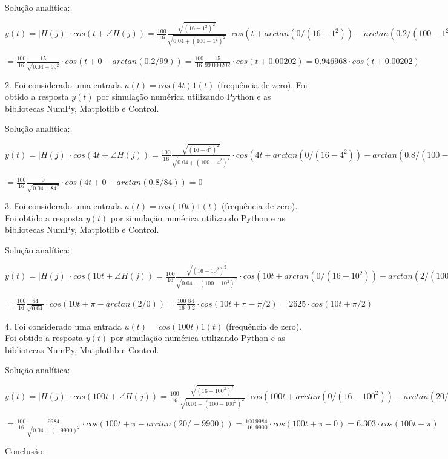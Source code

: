 \documentclass[10pt]{article}
\begin{document}
Solução analítica:

$y(t) = |H(j)| \cdot cos(t + \angle H(j)) = \frac{100}{16} \frac{\sqrt{(16-1^2)^2}}{\sqrt{0.04 + (100 - 1^2)^2}} \cdot cos(t + arctan(0/(16 - 1^2)) - arctan(0.2/(100 - 1^2))) =$

$= \frac{100}{16} \frac{15}{\sqrt{0.04 + 99^2}} \cdot cos(t + 0 - arctan(0.2/99)) = \frac{100}{16} \frac{15}{99.000202} \cdot cos(t + 0.00202) = 0.946968 \cdot cos(t + 0.00202)$

2. Foi considerado uma entrada $u(t) = cos(4 t) 1(t)$ (frequência de zero). Foi obtido a resposta $y(t)$ por simulação numérica utilizando Python
e as bibliotecas NumPy, Matplotlib e Control.

Solução analítica:

$y(t) = |H(j)| \cdot cos(4 t + \angle H(j)) = \frac{100}{16} \frac{\sqrt{(16-4^2)^2}}{\sqrt{0.04 + (100 - 4^2)^2}} \cdot cos(4 t + arctan(0/(16 - 4^2)) - arctan(0.8/(100 - 4^2))) =$

$= \frac{100}{16} \frac{0}{\sqrt{0.04 + 84^2}} \cdot cos(4 t + 0 - arctan(0.8/84)) = 0$

3. Foi considerado uma entrada $u(t) = cos(10 t) 1(t)$ (frequência de zero). Foi obtido a resposta $y(t)$ por simulação numérica utilizando Python
e as bibliotecas NumPy, Matplotlib e Control.

Solução analítica:

$y(t) = |H(j)| \cdot cos(10 t + \angle H(j)) = \frac{100}{16} \frac{\sqrt{(16-10^2)^2}}{\sqrt{0.04 + (100 - 10^2)^2}} \cdot cos(10 t + arctan(0/(16 - 10^2)) - arctan(2/(100 - 10^2))) =$

$= \frac{100}{16} \frac{84}{\sqrt{0.04}} \cdot cos(10 t + \pi - arctan(2/0)) = \frac{100}{16} \frac{84}{0.2} \cdot cos(10 t + \pi - \pi/2) = 2625 \cdot cos(10 t + \pi/2)$

4. Foi considerado uma entrada $u(t) = cos(100 t) 1(t)$ (frequência de zero). Foi obtido a resposta $y(t)$ por simulação numérica utilizando Python
e as bibliotecas NumPy, Matplotlib e Control.

Solução analítica:

$y(t) = |H(j)| \cdot cos(100 t + \angle H(j)) = \frac{100}{16} \frac{\sqrt{(16-100^2)^2}}{\sqrt{0.04 + (100 - 100^2)^2}} \cdot cos(100 t + arctan(0/(16 - 100^2)) - arctan(20/(100 - 100^2))) =$

$= \frac{100}{16} \frac{9984}{\sqrt{0.04 + (-9900)^2}} \cdot cos(100 t + \pi - arctan(20/-9900)) = \frac{100}{16} \frac{9984}{9900} \cdot cos(100 t + \pi - 0) = 6.303 \cdot cos(100 t + \pi)$

Conclusão:
\end{document}
